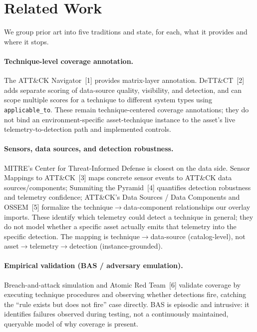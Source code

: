 \documentclass[10pt]{article}
\newcommand{\code}[1]{\texttt{#1}}
\begin{document}
\section{Related Work}
We group prior art into five traditions and state, for each, what it provides and where it stops.

\paragraph{Technique-level coverage annotation.} The ATT\&CK Navigator~[1] provides matrix-layer annotation. DeTT\&CT~[2] adds separate scoring of data-source quality, visibility, and detection, and can scope multiple scores for a technique to different system types using \code{applicable\_to}. These remain technique-centered coverage annotations; they do not bind an environment-specific asset-technique instance to the asset's live telemetry-to-detection path and implemented controls.

\paragraph{Sensors, data sources, and detection robustness.} MITRE's Center for Threat-Informed Defense is closest on the data side. Sensor Mappings to ATT\&CK~[3] maps concrete sensor events to ATT\&CK data sources/components; Summiting the Pyramid~[4] quantifies detection robustness and telemetry confidence; ATT\&CK's Data Sources / Data Components and OSSEM~[5] formalize the technique$\rightarrow$data-component relationships our overlay imports. These identify which telemetry could detect a technique in general; they do not model whether a specific asset actually emits that telemetry into the specific detection. The mapping is technique$\rightarrow$data-source (catalog-level), not asset$\rightarrow$telemetry$\rightarrow$detection (instance-grounded).

\paragraph{Empirical validation (BAS / adversary emulation).} Breach-and-attack simulation and Atomic Red Team~[6] validate coverage by executing technique procedures and observing whether detections fire, catching the ``rule exists but does not fire'' case directly. BAS is episodic and intrusive: it identifies failures observed during testing, not a continuously maintained, queryable model of why coverage is present.
\end{document}
